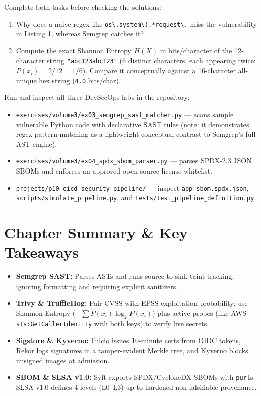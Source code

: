 \begin{tryityourselfbox}
Complete both tasks before checking the solutions:
\begin{enumerate}[leftmargin=12pt]
  \item Why does a naive regex like \verb|os\.system\(.*request\.| miss the vulnerability in Listing 1, whereas Semgrep catches it?
  \item Compute the exact Shannon Entropy $H(X)$ in bits/character of the 12-character string \texttt{"abc123abc123"} (6 distinct characters, each appearing twice: $P(x_i) = 2/12 = 1/6$). Compare it conceptually against a 16-character all-unique hex string (\texttt{4.0} bits/char).
\end{enumerate}
\end{tryityourselfbox}

\begin{labbridgebox}
Run and inspect all three DevSecOps labs in the repository:
\begin{itemize}[leftmargin=12pt]
  \item \texttt{exercises/volume3/ex03\_semgrep\_sast\_matcher.py} --- scans sample vulnerable Python code with declarative SAST rules (note: it demonstrates regex pattern matching as a lightweight conceptual contrast to Semgrep's full AST engine).
  \item \texttt{exercises/volume3/ex04\_spdx\_sbom\_parser.py} --- parses SPDX-2.3 JSON SBOMs and enforces an approved open-source license whitelist.
  \item \texttt{projects/p10-cicd-security-pipeline/} --- inspect \texttt{app-sbom.spdx.json}, \texttt{scripts/simulate\_pipeline.py}, and \texttt{tests/test\_pipeline\_definition.py}.
\end{itemize}
\end{labbridgebox}

\section{Chapter Summary \protect\& Key Takeaways}
\begin{itemize}[leftmargin=15pt]
  \item \textbf{Semgrep SAST:} Parses ASTs and runs source-to-sink taint tracking, ignoring formatting and requiring explicit sanitizers.
  \item \textbf{Trivy \& TruffleHog:} Pair CVSS with EPSS exploitation probability; use Shannon Entropy ($-\sum P(x_i)\log_2 P(x_i)$) plus active probes (like AWS \texttt{sts:GetCallerIdentity} with both keys) to verify live secrets.
  \item \textbf{Sigstore \& Kyverno:} Fulcio issues 10-minute certs from OIDC tokens, Rekor logs signatures in a tamper-evident Merkle tree, and Kyverno blocks unsigned images at admission.
  \item \textbf{SBOM \& SLSA v1.0:} Syft exports SPDX/CycloneDX SBOMs with \texttt{purl}s; SLSA v1.0 defines 4 levels (L0--L3) up to hardened non-falsifiable provenance.
\end{itemize}

